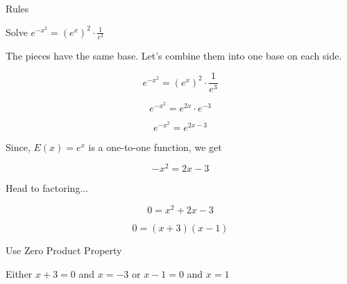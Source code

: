 \documentclass{ximera}
\begin{document}
\begin{example} Rules



Solve $e^{- x^2} = \left(e^x\right)^2 \cdot \frac{1}{e^3}$


\begin{explanation} 

The pieces have the same base.  Let's combine them into one base on each side.



\[  e^{- x^2} = \left(e^x\right)^2 \cdot \frac{1}{e^3}     \]

\[  e^{- x^2}  = e^{2x} \cdot e^{-3} \]

\[  e^{- x^2}  = e^{2x-3}  \]



Since, $E(x) = e^x$ is a one-to-one function, we get


\[  -x^2 = 2x - 3  \]


Head to factoring...


\[  0 = x^2 + 2x - 3  \]


\[  0 =(x+3)(x-1) \]


Use Zero Product Property



Either  $x+3 = 0$ and $x = -3$  or $x-1=0$ and $x = 1$


\end{explanation}
\end{example}
\end{document}

